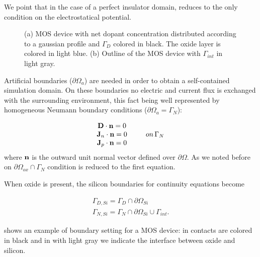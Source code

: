 We point that in the case of a perfect insulator domain,  reduces to the only condition on the electrostatical potential.

\begin{figure}[!b]
\centering
{}
\caption{(a) MOS device with net dopant concentration distributed according to a gaussian profile and $\Gamma_D$ colored in black. The oxide layer is colored in light blue. (b) Outline of the MOS device with $\Gamma_{int}$ in light gray. }
\label{fig: outline boundaries}
\end{figure}

Artificial boundaries ($\partial \Omega_a$) are needed in order to obtain a self-contained simulation domain.  On these boundaries no electric and current flux is exchanged with the surrounding environment, this fact being well represented by homogeneous Neumann boundary conditions ($\partial \Omega_a = \Gamma_N$):

\begin{equation}
\label{eq: neumann boundar condition}
\begin{array}{cc}
\vect{D}\cdot \vect{n} = 0 & \\
\vect{J}_n \cdot \vect{n} = 0 & \psp{10} on \, \Gamma_N \\
\vect{J}_p \cdot \vect{n} = 0 & 
\end{array}
\end{equation}
where $\mathbf{n}$ is the outward unit normal vector defined over $\partial \Omega$. 
As we noted before on $\partial \Omega_{ox} \cap \Gamma_N$ condition  is reduced to the first equation.

When oxide is present, the silicon boundaries for continuity equations become

\begin{equation}
\begin{array}{c}
\Gamma_{D,Si} = \Gamma_D \cap \partial \Omega_{Si} \\
\Gamma_{N,Si} = \Gamma_N \cap \partial \Omega_{Si} \cup \Gamma_{int}.
\end{array}
\end{equation}

 shows an example of boundary setting for a MOS device: in  contacts are colored in black and in  with light gray we indicate the interface between oxide and silicon.

